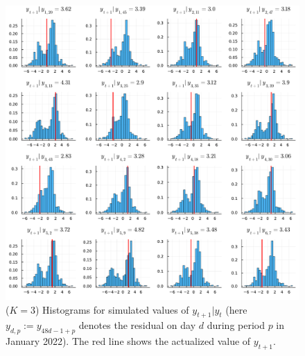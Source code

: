 \documentclass[11pt,twoside,openany]{book}
\newcommand{\code}[1]{\texttt{#1}}
\numberwithin{Theorem}{chapter}
\numberwithin{Definition}{chapter}
\numberwithin{Lemma}{chapter}
\numberwithin{Algorithm}{chapter}
\numberwithin{equation}{chapter}
\begin{document}
\begin{figure}[htp]
  \centering
  \includegraphics[scale=0.5]{../elexon/figures/ytp1_giv_yt_jan_22_Keq3.pdf}
  \caption{($K=3$) Histograms for simulated values of $y_{t+1}|y_{t}$ (here $y_{d,p}:=y_{48d - 1 + p}$ denotes the residual on day $d$ during period $p$ in January
    2022).
The red line shows the actualized value of $y_{t+1}$.}\label{fig:jan22_hists_k3}
\end{figure}




\end{document}
